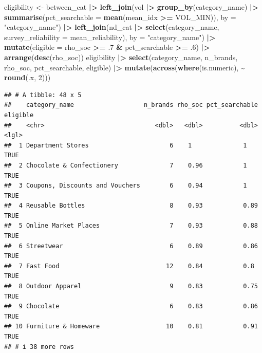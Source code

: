 \documentclass[
]{article}
\newenvironment{Shaded}{\begin{snugshade}}{\end{snugshade}}
\newcommand{\AttributeTok}[1]{\textcolor[rgb]{0.13,0.29,0.53}{#1}}
\newcommand{\DecValTok}[1]{\textcolor[rgb]{0.00,0.00,0.81}{#1}}
\newcommand{\FunctionTok}[1]{\textcolor[rgb]{0.13,0.29,0.53}{\textbf{#1}}}
\newcommand{\NormalTok}[1]{#1}
\newcommand{\OtherTok}[1]{\textcolor[rgb]{0.56,0.35,0.01}{#1}}
\newcommand{\SpecialCharTok}[1]{\textcolor[rgb]{0.81,0.36,0.00}{\textbf{#1}}}
\newcommand{\StringTok}[1]{\textcolor[rgb]{0.31,0.60,0.02}{#1}}
\begin{document}
\begin{Shaded}
\begin{Highlighting}[]
\NormalTok{eligibility }\OtherTok{\textless{}{-}}\NormalTok{ between\_cat }\SpecialCharTok{|\textgreater{}}
  \FunctionTok{left\_join}\NormalTok{(vol }\SpecialCharTok{|\textgreater{}} \FunctionTok{group\_by}\NormalTok{(category\_name) }\SpecialCharTok{|\textgreater{}}
              \FunctionTok{summarise}\NormalTok{(}\AttributeTok{pct\_searchable =} \FunctionTok{mean}\NormalTok{(mean\_idx }\SpecialCharTok{\textgreater{}=}\NormalTok{ VOL\_MIN)),}
            \AttributeTok{by =} \StringTok{"category\_name"}\NormalTok{) }\SpecialCharTok{|\textgreater{}}
  \FunctionTok{left\_join}\NormalTok{(nd\_cat }\SpecialCharTok{|\textgreater{}} \FunctionTok{select}\NormalTok{(category\_name, }\AttributeTok{survey\_reliability =}\NormalTok{ mean\_reliability),}
            \AttributeTok{by =} \StringTok{"category\_name"}\NormalTok{) }\SpecialCharTok{|\textgreater{}}
  \FunctionTok{mutate}\NormalTok{(}\AttributeTok{eligible =}\NormalTok{ rho\_soc }\SpecialCharTok{\textgreater{}=}\NormalTok{ .}\DecValTok{7} \SpecialCharTok{\&}\NormalTok{ pct\_searchable }\SpecialCharTok{\textgreater{}=}\NormalTok{ .}\DecValTok{6}\NormalTok{) }\SpecialCharTok{|\textgreater{}}
  \FunctionTok{arrange}\NormalTok{(}\FunctionTok{desc}\NormalTok{(rho\_soc))}
\NormalTok{eligibility }\SpecialCharTok{|\textgreater{}}
  \FunctionTok{select}\NormalTok{(category\_name, n\_brands, rho\_soc, pct\_searchable, eligible) }\SpecialCharTok{|\textgreater{}}
  \FunctionTok{mutate}\NormalTok{(}\FunctionTok{across}\NormalTok{(}\FunctionTok{where}\NormalTok{(is.numeric), }\SpecialCharTok{\textasciitilde{}} \FunctionTok{round}\NormalTok{(.x, }\DecValTok{2}\NormalTok{)))}
\end{Highlighting}
\end{Shaded}

\begin{verbatim}
## # A tibble: 48 x 5
##    category_name                   n_brands rho_soc pct_searchable eligible
##    <chr>                              <dbl>   <dbl>          <dbl> <lgl>   
##  1 Department Stores                      6    1              1    TRUE    
##  2 Chocolate & Confectionery              7    0.96           1    TRUE    
##  3 Coupons, Discounts and Vouchers        6    0.94           1    TRUE    
##  4 Reusable Bottles                       8    0.93           0.89 TRUE    
##  5 Online Market Places                   7    0.93           0.88 TRUE    
##  6 Streetwear                             6    0.89           0.86 TRUE    
##  7 Fast Food                             12    0.84           0.8  TRUE    
##  8 Outdoor Apparel                        9    0.83           0.75 TRUE    
##  9 Chocolate                              6    0.83           0.86 TRUE    
## 10 Furniture & Homeware                  10    0.81           0.91 TRUE    
## # i 38 more rows
\end{verbatim}
\end{document}
